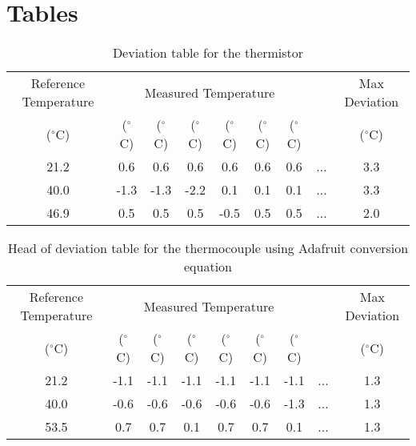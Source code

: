 \section{Tables}
\label{sec:tables}

\begin{table}[h]
    \centering
    \caption{Deviation table for the thermistor}
    \label{tab:thermistor_calibration_deviation}
    \begin{tabular}{ccccccccc}
        \toprule
        Reference Temperature & \multicolumn{6}{c}{Measured Temperature} &  & Max Deviation \\
        \cmidrule{2-7}
        ($^\circ$C) & ($^\circ$C) & ($^\circ$C) & ($^\circ$C) & ($^\circ$C) & ($^\circ$C) & ($^\circ$C) &  & ($^\circ$C) \\
        \midrule
        21.2 & 0.6 & 0.6 & 0.6 & 0.6 & 0.6 & 0.6 & ... & 3.3 \\
        40.0 & -1.3 & -1.3 & -2.2 & 0.1 & 0.1 & 0.1 & ... & 3.3 \\
        46.9 & 0.5 & 0.5 & 0.5 & -0.5 & 0.5 & 0.5 & ... & 2.0 \\
        \bottomrule
    \end{tabular}
\end{table}

\begin{table}[h]
    \centering
    \caption{Head of deviation table for the thermocouple using Adafruit conversion equation}
    \label{tab:thermocouple_calibration_deviation_adafruit}
    \begin{tabular}{ccccccccc}
        \toprule
        Reference Temperature & \multicolumn{6}{c}{Measured Temperature} &  & Max Deviation \\
        \cmidrule{2-7}
        ($^\circ$C) & ($^\circ$C) & ($^\circ$C) & ($^\circ$C) & ($^\circ$C) & ($^\circ$C) & ($^\circ$C) &  & ($^\circ$C) \\
        \midrule
        21.2 & -1.1 & -1.1 & -1.1 & -1.1 & -1.1 & -1.1 &  ... & 1.3 \\
        40.0 & -0.6 & -0.6 & -0.6 & -0.6 & -0.6 & -1.3 &  ... & 1.3 \\
        53.5 & 0.7 & 0.7 & 0.1 & 0.7 & 0.7 & 0.1 &  ... & 1.3 \\
        \bottomrule
    \end{tabular}
\end{table}

